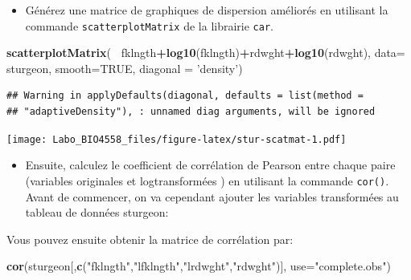 \documentclass[12pt,]{book}
\newenvironment{Shaded}{\begin{snugshade}}{\end{snugshade}}
\newcommand{\DataTypeTok}[1]{\textcolor[rgb]{0.27,0.27,0.27}{#1}}
\newcommand{\KeywordTok}[1]{\textcolor[rgb]{0.27,0.27,0.27}{\textbf{#1}}}
\newcommand{\NormalTok}[1]{#1}
\newcommand{\OperatorTok}[1]{\textcolor[rgb]{0.43,0.43,0.43}{\textbf{#1}}}
\newcommand{\OtherTok}[1]{\textcolor[rgb]{0.37,0.37,0.37}{#1}}
\newcommand{\StringTok}[1]{\textcolor[rgb]{0.5,0.5,0.5}{#1}}
\providecommand{\tightlist}{%
  \setlength{\itemsep}{0pt}\setlength{\parskip}{0pt}}
\begin{document}
\begin{itemize}
\tightlist
\item
  Générez une matrice de graphiques de dispersion améliorés en utilisant la commande \texttt{scatterplotMatrix} de la librairie \texttt{car}.
\end{itemize}

\begin{Shaded}
\begin{Highlighting}[]
\KeywordTok{scatterplotMatrix}\NormalTok{(}
  \OperatorTok{~}\NormalTok{fklngth}\OperatorTok{+}\KeywordTok{log10}\NormalTok{(fklngth)}\OperatorTok{+}\NormalTok{rdwght}\OperatorTok{+}\KeywordTok{log10}\NormalTok{(rdwght),}
  \DataTypeTok{data=}\NormalTok{ sturgeon,}
  \DataTypeTok{smooth=}\OtherTok{TRUE}\NormalTok{, }\DataTypeTok{diagonal =} \StringTok{'density'}\NormalTok{)}
\end{Highlighting}
\end{Shaded}

\begin{verbatim}
## Warning in applyDefaults(diagonal, defaults = list(method =
## "adaptiveDensity"), : unnamed diag arguments, will be ignored
\end{verbatim}

\texttt{[image: Labo\_BIO4558\_files/figure-latex/stur-scatmat-1.pdf]}

\begin{itemize}
\tightlist
\item
  Ensuite, calculez le coefficient de corrélation de Pearson entre chaque paire (variables originales et logtransformées ) en utilisant la commande \texttt{cor()}.
  Avant de commencer, on va cependant ajouter les variables transformées au tableau de données sturgeon:
\end{itemize}

\begin{Shaded}
\end{Shaded}

Vous pouvez ensuite obtenir la matrice de corrélation par:

\begin{Shaded}
\begin{Highlighting}[]
\KeywordTok{cor}\NormalTok{(sturgeon[,}\KeywordTok{c}\NormalTok{(}\StringTok{"fklngth"}\NormalTok{,}\StringTok{"lfklngth"}\NormalTok{,}\StringTok{"lrdwght"}\NormalTok{,}\StringTok{"rdwght"}\NormalTok{)], }\DataTypeTok{use=}\StringTok{"complete.obs"}\NormalTok{)}
\end{Highlighting}
\end{Shaded}
\end{document}
